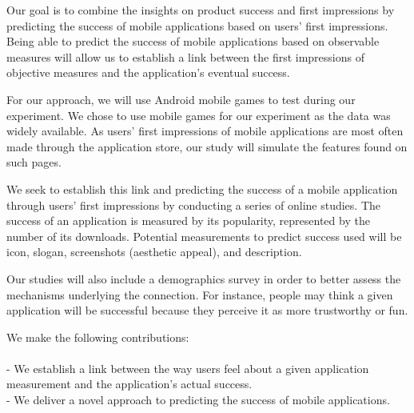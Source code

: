 Our goal is to combine the insights on product success and first impressions by predicting the success of mobile applications based on users' first impressions. Being able to predict the success of mobile applications  based on observable measures will allow us to establish a link between the first impressions of objective measures and the application’s eventual success.

For our approach, we will use Android mobile games to test during our experiment. We chose to use mobile games for our experiment as the data was widely available. As users' first impressions of mobile applications are most often made through the application store, our study will simulate the features found on such pages.

We seek to establish this link and predicting the success of a mobile application through users' first impressions by conducting a series of online studies. The success of an application is measured by its popularity, represented by the number of its downloads. Potential measurements to predict success used will be icon, slogan, screenshots (aesthetic appeal), and description.

Our studies will also include a demographics survey in order to better assess the mechanisms underlying the connection. For instance, people may think a given application will be successful because they perceive it as more trustworthy or fun.

We make the following contributions: \\ \\
- We establish a link between the way users feel about a given application measurement and the application's actual success.\\
- We deliver a novel approach to predicting the success of mobile applications.
